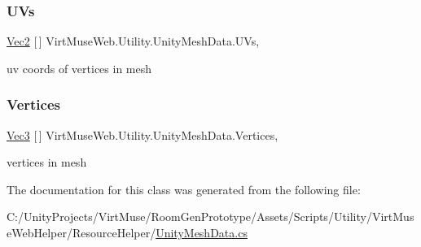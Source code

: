 \subsubsection{\texorpdfstring{U\+Vs}{UVs}}
{\footnotesize\ttfamily \mbox{\hyperlink{class_virt_muse_web_1_1_utility_1_1_vec2}{Vec2}} \mbox{[}$\,$\mbox{]} Virt\+Muse\+Web.\+Utility.\+Unity\+Mesh\+Data.\+U\+Vs\hspace{0.3cm}{\ttfamily [get]}, {\ttfamily [set]}}



uv coords of vertices in mesh 

\mbox{\label{class_virt_muse_web_1_1_utility_1_1_unity_mesh_data_ab521629085e0dc212a7a32268c3c1c65}} 
\subsubsection{\texorpdfstring{Vertices}{Vertices}}
{\footnotesize\ttfamily \mbox{\hyperlink{class_virt_muse_web_1_1_utility_1_1_vec3}{Vec3}} \mbox{[}$\,$\mbox{]} Virt\+Muse\+Web.\+Utility.\+Unity\+Mesh\+Data.\+Vertices\hspace{0.3cm}{\ttfamily [get]}, {\ttfamily [set]}}



vertices in mesh 



The documentation for this class was generated from the following file\+:\begin{DoxyCompactItemize}
\item 
C\+:/\+Unity\+Projects/\+Virt\+Muse/\+Room\+Gen\+Prototype/\+Assets/\+Scripts/\+Utility/\+Virt\+Muse\+Web\+Helper/\+Resource\+Helper/\mbox{\hyperlink{_unity_mesh_data_8cs}{Unity\+Mesh\+Data.\+cs}}\end{DoxyCompactItemize}
